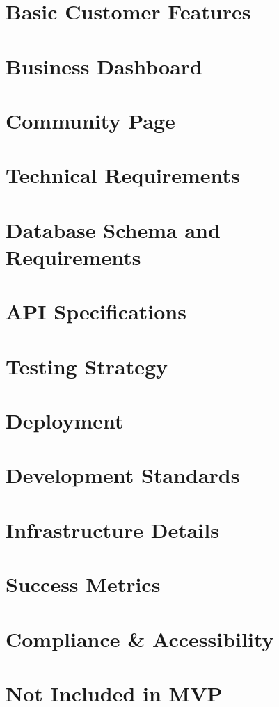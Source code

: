 \documentclass{article}
\begin{document}
\section{Basic Customer Features}


\section{Business Dashboard}


\section{Community Page}


\section{Technical Requirements}


\section{Database Schema and Requirements}


\section{API Specifications}


\section{Testing Strategy}


\section{Deployment}


\section{Development Standards}


\section{Infrastructure Details}


\section{Success Metrics}


\section{Compliance \& Accessibility}


\section{Not Included in MVP}


% 
\end{document}
